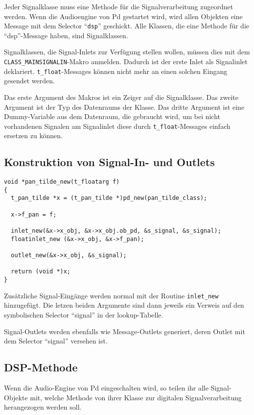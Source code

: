 \documentclass[12pt, a4paper,austrian, titlepage]{article}
\begin{document}
Jeder Signalklasse muss eine Methode für die Signalverarbeitung zugeordnet werden.
Wenn die Audioengine von Pd gestartet wird, wird allen Objekten eine
Message mit dem Selector ``\verb+dsp+'' geschickt.
Alle Klassen, die eine Methode für die ``dsp''-Message haben, sind Signalklassen.

Signalklassen, die Signal-Inlets zur Verfügung stellen wollen,
müssen dies mit dem \verb+CLASS_MAINSIGNALIN+-Makro anmelden.
Dadurch ist der erste Inlet als Signalinlet deklariert.
\verb+t_float+-Messages können nicht mehr an einen solchen Eingang
gesendet werden.

Das erste Argument des Makros ist ein Zeiger auf die Signalklasse.
Das zweite Argument ist der Typ des Datenraums der Klasse.
Das dritte Argument ist eine Dummy-Variable aus dem Datenraum, die gebraucht wird,
um bei nicht vorhandenen Signalen am Signalinlet diese durch \verb+t_float+-Messages
einfach ersetzen zu können.

\subsection{Konstruktion von Signal-In- und Outlets}

\begin{verbatim}
void *pan_tilde_new(t_floatarg f)
{
  t_pan_tilde *x = (t_pan_tilde *)pd_new(pan_tilde_class);

  x->f_pan = f;
  
  inlet_new(&x->x_obj, &x->x_obj.ob_pd, &s_signal, &s_signal);
  floatinlet_new (&x->x_obj, &x->f_pan);

  outlet_new(&x->x_obj, &s_signal);

  return (void *)x;
}
\end{verbatim}

Zusätzliche Signal-Eingänge werden normal mit der Routine \verb+inlet_new+
hinzugefügt.
Die letzen beiden Argumente sind dann jeweils ein Verweis auf den symbolischen Selector
``signal'' in der lookup-Tabelle.

Signal-Outlets werden ebenfalls wie Message-Outlets generiert, deren Outlet mit dem
Selector ``signal'' versehen ist.


\subsection{DSP-Methode}
Wenn die Audio-Engine von Pd eingeschalten wird,
so teilen ihr alle Signal-Objekte mit,
welche Methode von ihrer Klasse zur digitalen Signalverarbeitung herangezogen werden soll.
\end{document}

